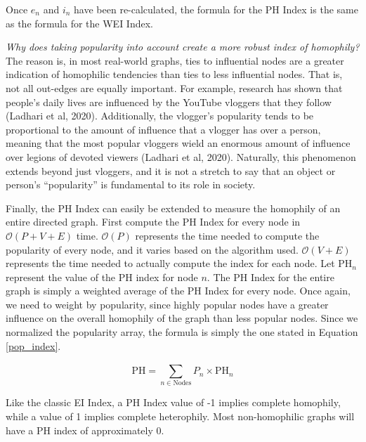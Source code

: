 \documentclass{article}
\begin{document}

Once \(e_{n}\) and \(i_{n}\) have been re-calculated, the formula for
the PH Index is the same as the formula for the WEI Index.

\emph{Why does taking popularity into account create a more robust index
of homophily?} The reason is, in most real-world graphs, ties to
influential nodes are a greater indication of homophilic tendencies than
ties to less influential nodes. That is, not all out-edges are equally
important. For example, research has shown that people's daily lives are
influenced by the YouTube vloggers that they follow (Ladhari et al,
2020). Additionally, the vlogger's popularity tends to be proportional
to the amount of influence that a vlogger has over a person, meaning
that the most popular vloggers wield an enormous amount of influence
over legions of devoted viewers (Ladhari et al, 2020). Naturally, this
phenomenon extends beyond just vloggers, and it is not a stretch to say
that an object or person's ``popularity'' is fundamental to its role in
society.

Finally, the PH Index can easily be extended to measure the homophily of
an entire directed graph. First compute the PH Index for every node in
\(\mathcal{O}(P + V + E)\) time. \(\mathcal{O}(P)\) represents the time
needed to compute the popularity of every node, and it varies based on
the algorithm used. \(\mathcal{O}(V + E)\) represents the time needed to
actually compute the index for each node. Let \(\mathrm{PH}_{n}\)
represent the value of the PH index for node $n$. The PH Index for
the entire graph is simply a weighted average of the PH Index for every
node. Once again, we need to weight by popularity, since highly popular
nodes have a greater influence on the overall homophily of the graph
than less popular nodes. Since we normalized the popularity array, the
formula is simply the one stated in Equation \ref{pop_index}.

\begin{equation}
\label{pop_index}
\mathrm{PH} = \sum_{n \in \text{Nodes}}^{}{P_{n} \times \mathrm{PH}_{n}}
\end{equation}


Like the classic EI Index, a PH Index value of -1 implies complete
homophily, while a value of 1 implies complete heterophily. Most
non-homophilic graphs will have a PH index of approximately 0.
\end{document}
